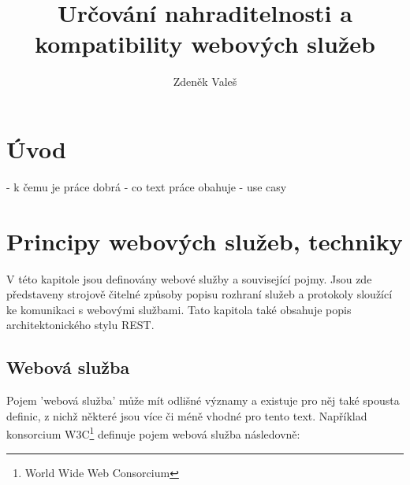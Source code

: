 \documentclass[czech,DP]{thesiskiv}
\author{Zdeněk Valeš}
\title{Určování nahraditelnosti a\\kompatibility webových služeb}
\begin{document}
%
\maketitle
\tableofcontents

\chapter{Úvod}

- k čemu je práce dobrá
- co text práce obahuje
- use casy

\chapter{Principy webových služeb, techniky}
\label{sec:web-services-principles}

V této kapitole jsou definovány webové služby a související pojmy. Jsou zde představeny strojově čitelné způsoby popisu rozhraní služeb a protokoly sloužící ke komunikaci s webovými službami. Tato kapitola také obsahuje popis architektonického stylu REST. 

%

\section{Webová služba}




Pojem 'webová služba' může mít odlišné významy\cite{w3cWsDesignIssues} a existuje pro něj také spousta definic, z nichž některé jsou více či méně vhodné pro tento text. Například konsorcium W3C\footnote{World Wide Web Consorcium} definuje pojem webová služba následovně\cite{w3cWsArch}:
\end{document}
